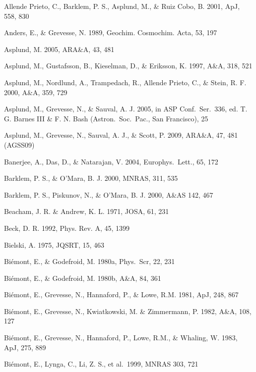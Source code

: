 \documentclass[traditabstract]{aa}
\begin{document}
\begin{thebibliography}{}

  Allende Prieto, C., Barklem, P. S., Asplund, M., \& Ruiz Cobo, B. 2001, ApJ, 558, 830

  Anders, E., \& Grevesse, N. 1989, Geochim. Cosmochim. Acta, 53, 197
  
  Asplund, M. 2005, ARA\&A, 43, 481

  Asplund, M., Gustafsson, B., Kieselman, D., \& Eriksson, K. 1997, A\&A, 318, 521

  Asplund, M., Nordlund, A., Trampedach, R., Allende Prieto, C., \& Stein, R. F. 2000, A\&A, 359, 729

  Asplund, M., Grevesse, N., \& Sauval, A. J. 2005, in ASP Conf.\ Ser.\ 336, ed. T. G. Barnes III \& F. N. Bash (Astron.\ Soc.\ Pac., San Francisco), 25

  Asplund, M., Grevesse, N., Sauval, A. J., \& Scott, P. 2009, ARA\&A, 47, 481 (AGSS09)

  Banerjee, A., Das, D., \& Natarajan, V. 2004, Europhys.\ Lett., 65, 172

  Barklem, P. S., \& O'Mara, B. J. 2000, MNRAS, 311, 535

  Barklem, P. S., Piskunov, N., \& O'Mara, B. J. 2000, A\&AS 142, 467

  Beacham, J. R. \& Andrew, K. L. 1971, JOSA, 61, 231

  Beck, D. R. 1992, Phys. Rev. A, 45, 1399

  Bielski, A. 1975, JQSRT, 15, 463

  Bi\'emont, E., \& Godefroid, M. 1980a, Phys.\ Scr, 22, 231

  Bi\'emont, E., \& Godefroid, M. 1980b, A\&A, 84, 361

  Bi\'emont, E., Grevesse, N., Hannaford, P., \& Lowe, R.M. 1981, ApJ, 248, 867
 
  Bi\'emont, E., Grevesse, N., Kwiatkowski, M. \& Zimmermann, P. 1982, A\&A, 108, 127

  Bi\'emont, E., Grevesse, N., Hannaford, P., Lowe, R.M., \& Whaling, W. 1983, ApJ, 275, 889

  Bi\'emont, E., Lynga, C., Li, Z. S., et al.\ 1999, MNRAS 303, 721


\end{thebibliography}
\end{document}
